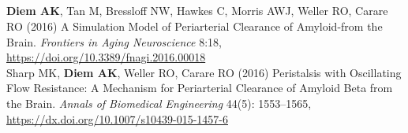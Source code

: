 \documentclass[margin,line,10pt]{res}
\begin{document}
\begin{resume}
\section{}
{\bf Diem AK}, Tan M, Bressloff NW, Hawkes C, Morris AWJ, Weller RO, Carare RO (2016) A Simulation Model of Periarterial Clearance of Amyloid-\textbeta from the Brain. \textit{Frontiers in Aging Neuroscience} 8:18, \url{https://doi.org/10.3389/fnagi.2016.00018}\\
Sharp MK, {\bf Diem AK}, Weller RO, Carare RO (2016) Peristalsis with Oscillating Flow Resistance: A Mechanism for Periarterial Clearance of Amyloid Beta from the Brain. \textit{Annals of Biomedical Engineering} 44(5): 1553--1565, \url{https://dx.doi.org/10.1007/s10439-015-1457-6}\\

\end{resume}
\end{document}

